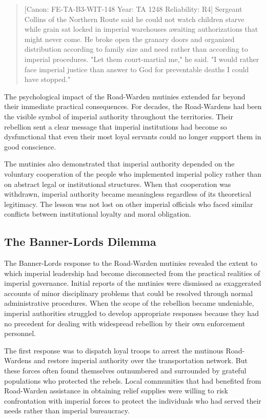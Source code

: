 \begin{quote}
{[}Canon: FE-TA-B3-WIT-148 \textbar{} Year: TA 1248 \textbar{}
Reliability: R4{]} Sergeant Collins of the Northern Route said he could
not watch children starve while grain sat locked in imperial warehouses
awaiting authorizations that might never come. He broke open the granary
doors and organized distribution according to family size and need
rather than according to imperial procedures. "Let them court-martial
me," he said. "I would rather face imperial justice than answer to God
for preventable deaths I could have stopped."
\end{quote}

The psychological impact of the Road-Warden mutinies extended far beyond
their immediate practical consequences. For decades, the Road-Wardens
had been the visible symbol of imperial authority throughout the
territories. Their rebellion sent a clear message that imperial
institutions had become so dysfunctional that even their most loyal
servants could no longer support them in good conscience.

The mutinies also demonstrated that imperial authority depended on the
voluntary cooperation of the people who implemented imperial policy
rather than on abstract legal or institutional structures. When that
cooperation was withdrawn, imperial authority became meaningless
regardless of its theoretical legitimacy. The lesson was not lost on
other imperial officials who faced similar conflicts between
institutional loyalty and moral obligation.

\subsection{The Banner-Lord\textquotesingle s
Dilemma}\label{the-banner-lords-dilemma}

The Banner-Lord\textquotesingle s response to the Road-Warden mutinies
revealed the extent to which imperial leadership had become disconnected
from the practical realities of imperial governance. Initial reports of
the mutinies were dismissed as exaggerated accounts of minor
disciplinary problems that could be resolved through normal
administrative procedures. When the scope of the rebellion became
undeniable, imperial authorities struggled to develop appropriate
responses because they had no precedent for dealing with widespread
rebellion by their own enforcement personnel.

The first response was to dispatch loyal troops to arrest the mutinous
Road-Wardens and restore imperial authority over the transportation
network. But these forces often found themselves outnumbered and
surrounded by grateful populations who protected the rebels. Local
communities that had benefited from Road-Warden assistance in obtaining
relief supplies were willing to risk confrontation with imperial forces
to protect the individuals who had served their needs rather than
imperial bureaucracy.

